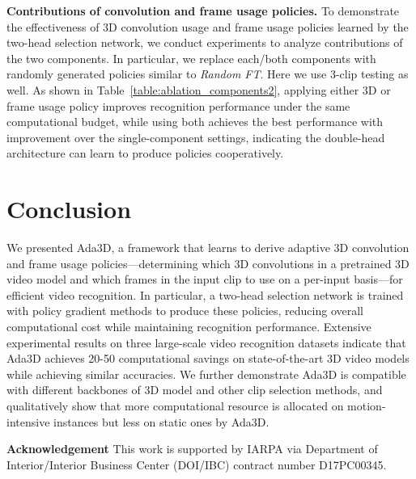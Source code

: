 \documentclass[final]{cvpr}
\newcommand{\system}{{Ada3D}\xspace}
\begin{document}
\vspace{-0.1in}
\noindent\textbf{Contributions of convolution and frame usage policies.} To demonstrate the effectiveness of 3D convolution usage and frame usage policies learned by the two-head selection network, we conduct experiments to analyze contributions of the two components. In particular, we replace each/both components with randomly generated policies similar to \emph{Random FT}. Here we use 3-clip testing as well. As shown in Table~\ref{table:ablation_components2}, applying either 3D or frame usage policy improves recognition performance under the same computational budget, while using both achieves the best performance with  improvement over the single-component settings, indicating the double-head architecture can learn to produce policies cooperatively.



\section{Conclusion}
We presented \system, a framework that learns to derive adaptive 3D convolution and frame usage policies---determining which 3D convolutions in a pretrained 3D video model and which frames in the input clip to use on a per-input basis---for efficient video recognition. In particular, a two-head selection network is trained with policy gradient methods to produce these policies, reducing overall computational cost while maintaining recognition performance. Extensive experimental results on three large-scale video recognition datasets indicate that \system achieves 20-50 computational savings on state-of-the-art 3D video models while achieving similar accuracies. We further demonstrate \system is compatible with different backbones of 3D model and other clip selection methods, and qualitatively show that more computational resource is allocated on motion-intensive instances but less on static ones by \system.

\textbf{Acknowledgement} \small This work is supported by IARPA via Department of Interior/Interior Business Center (DOI/IBC) contract number D17PC00345.

{\small


}
\end{document}

